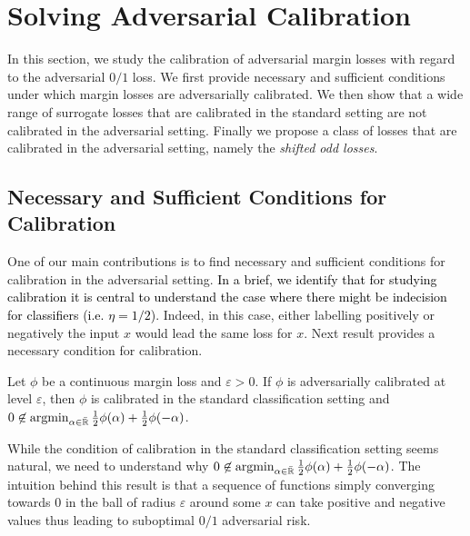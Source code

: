 \section{Solving Adversarial Calibration}
\label{sec:calibration}
In this section,  we study the calibration of adversarial margin losses with regard to the adversarial $0/1$ loss. We first provide necessary and sufficient conditions under which margin losses are adversarially calibrated. We then show that a wide range of surrogate losses that are calibrated in the standard setting are not calibrated in the adversarial setting. Finally we propose a class of losses that are calibrated in the adversarial setting, namely the \emph{shifted odd losses}.

\subsection{Necessary and Sufficient Conditions for Calibration}

One of our main contributions is to find necessary and sufficient conditions for calibration in the adversarial setting. \textcolor{black}{In a brief, we identify that for studying calibration it is central to understand  the case where there might be indecision for classifiers (i.e. $\eta=1/2$)}. Indeed, in this case, either labelling positively or negatively the input $x$ would lead the same loss for $x$. Next result provides a necessary condition for calibration. 

\begin{thm} 
\label{thm:calibration-nec}
Let $\phi$  be a continuous margin loss and $\varepsilon>0$. If $\phi$ is adversarially  calibrated at level $\varepsilon$, then $\phi$ is  calibrated in the standard classification setting and $0\not\in \operatorname*{argmin}_{\alpha\in\bar{\mathbb{R}}}
\frac12\phi(\alpha)+\frac12\phi(-\alpha)$. 
\end{thm}

While the condition of calibration in the standard classification setting seems natural, we need to understand why $0\not\in \operatorname*{argmin}_{\alpha\in\bar{\mathbb{R}}}
\frac12\phi(\alpha)+\frac12\phi(-\alpha)$. The intuition behind this result is that a sequence of functions simply converging towards $0$ in the ball of radius $\varepsilon$ around some $x$ can take positive and negative values thus leading to suboptimal $0/1$ adversarial risk. 

